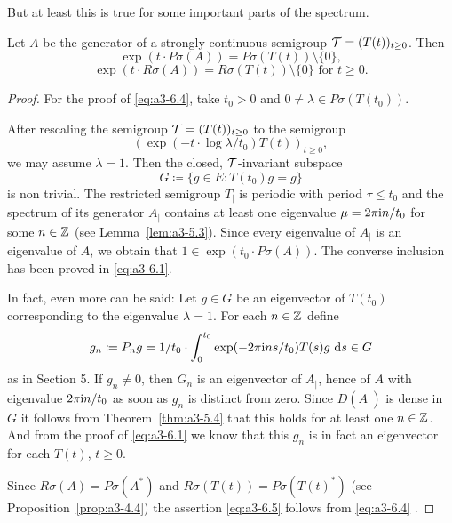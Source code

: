 But at least this is true for some important parts of the spectrum.
\begin{theorem}\label{thm:a3-6.3}
Let $A$ be the generator of a strongly continuous semigroup $\mathcal{T} = (T(t))_{t \geq 0}$.
Then
\begin{equation}\label{eq:a3-6.4}
\exp(t \cdot P\sigma(A)) = P\sigma(T(t)) \setminus \{0\} ,
\end{equation}
\begin{equation}\label{eq:a3-6.5}
\exp(t \cdot R\sigma(A)) = R\sigma(T(t)) \setminus \{0\} \text{ for } t \geq 0 .
\end{equation}
\end{theorem}
\begin{proof}
For the proof of \eqref{eq:a3-6.4},  take $t_{0} > 0$ and $0 \neq \lambda \in P\sigma(T(t_{0}))$.

After rescaling the semigroup $\mathcal{T} = (T(t))_{t \geq 0}$ to the semigroup
\[
(\exp(-t \cdot \log\lambda/t_{0})T(t))_{t \geq 0} ,
\]
we may assume $\lambda = 1$. 
Then the closed, $\mathcal{T}$-invariant subspace
\[
G \coloneqq \{g \in E \colon T(t_{0})g = g\}
\]
is non trivial.
The restricted semigroup $T_{|}$ is periodic with period $\tau \leq t_{0}$ and the spectrum of its generator $A_{|}$ contains at least one eigenvalue $\mu = 2\pi\mathrm{i} n/t_{0}$ for some $n \in \mathbb{Z}$ (see Lemma~\ref{lem:a3-5.3}).
Since every eigenvalue of $A_{|}$ is an eigenvalue of $A$, we obtain that $1 \in \exp(t_{0} \cdot P\sigma(A))$.
The converse inclusion has been proved in \eqref{eq:a3-6.1}.

In fact, even more can be said: Let $g \in G$ be an eigenvector of $T(t_{0})$ corresponding to the eigenvalue $\lambda = 1$.
For each $n \in \mathbb{Z}$ define
\[
g_{n} \coloneqq P_{n}g = 1/t_{0} \cdot \int_{0}^{t_{0}} \exp(-2\pi\mathrm{i} ns/t_{0})T(s)g \, \mathop{}\!\mathrm{d}{s} \in G
\]
as in Section 5.
If $g_{n} \ne 0$, then $G_n$ is an eigenvector of $A_{|}$, hence of $A$ with eigenvalue $2\pi\mathrm{i} n/t_{0}$ as soon as $g_{n}$ is distinct from zero.
Since $D(A_{|})$ is dense in $G$ it follows from Theorem~\ref{thm:a3-5.4} that this holds for at least one $n \in \mathbb{Z}$.
And from the proof of \eqref{eq:a3-6.1} we know that this $g_{n}$ is in fact an eigenvector for each $T(t)$, $t \geq 0$.

Since $R\sigma(A) = P\sigma(A^*)$ and $R\sigma(T(t)) = P\sigma(T(t)^*)$ (see Proposition~\ref{prop:a3-4.4}) the assertion \eqref{eq:a3-6.5}  follows from \eqref{eq:a3-6.4} .
\end{proof}
